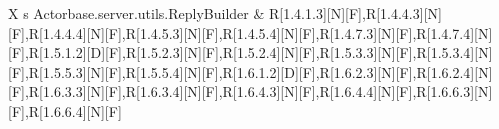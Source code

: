 \begin{longtable}{X s}
\hline
Actorbase.server.utils.ReplyBuilder & R[1.4.1.3][N][F],\newline R[1.4.4.3][N][F],\newline R[1.4.4.4][N][F],\newline R[1.4.5.3][N][F],\newline R[1.4.5.4][N][F],\newline R[1.4.7.3][N][F],\newline R[1.4.7.4][N][F],\newline R[1.5.1.2][D][F],\newline R[1.5.2.3][N][F],\newline R[1.5.2.4][N][F],\newline R[1.5.3.3][N][F],\newline R[1.5.3.4][N][F],\newline R[1.5.5.3][N][F],\newline R[1.5.5.4][N][F],\newline R[1.6.1.2][D][F],\newline R[1.6.2.3][N][F],\newline R[1.6.2.4][N][F],\newline R[1.6.3.3][N][F],\newline R[1.6.3.4][N][F],\newline R[1.6.4.3][N][F],\newline R[1.6.4.4][N][F],\newline R[1.6.6.3][N][F],\newline R[1.6.6.4][N][F] \\
\hline
\bottomrule
\caption{Tracciamento classi-requisiti}
\end{longtable}

